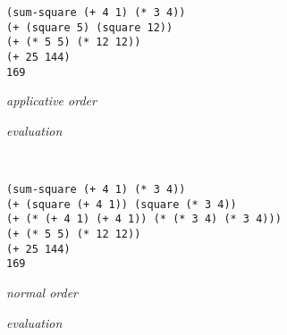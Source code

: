 \begin{frame}[fragile]{}
	\begin{minipage}{0.45\textwidth}
		\texttt{(sum-square (+ 4 1) (* 3 4))} \\[0.25cm]
		\texttt{(+ (square 5) (square 12))} \\[0.25cm]
		\texttt{(+ (* 5 5) (* 12 12))} \\[0.25cm]
		\texttt{(+ 25 144)} \\[0.25cm]
		\texttt{169} \\[0.7cm]
		\begin{center}
			\textit{applicative order}
			
			\textit{evaluation}
		\end{center}
	\end{minipage}~\begin{minipage}{0.55\textwidth}
		\texttt{(sum-square (+ 4 1) (* 3 4))} \\[0.25cm]
		\texttt{(+ (square (+ 4 1)) (square (* 3 4))} \\[0.25cm]
		\texttt{(+ (* (+ 4 1) (+ 4 1)) (* (* 3 4) (* 3 4)))} \\[0.25cm]
		\texttt{(+ (* 5 5) (* 12 12))} \\[0.25cm]
		\texttt{(+ 25 144)} \\[0.25cm]
		\texttt{169} \\[0cm]
		\begin{center}
			\textit{normal order}
			
			\textit{evaluation}
		\end{center}
	\end{minipage}
\end{frame}

